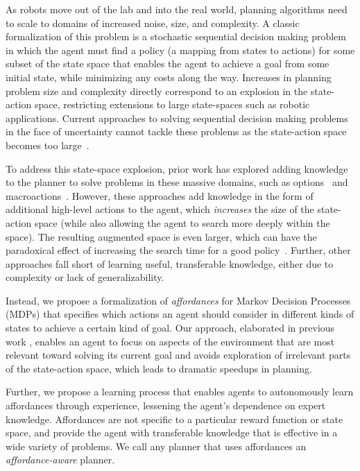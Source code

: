 \documentclass[letterpaper]{article}
\begin{document}
As robots move out of the lab and into the real world, planning
algorithms need to scale to domains of increased noise, size, and
complexity.  A classic formalization of this problem is a stochastic
sequential decision making problem in which the agent must find a
policy (a mapping from states to actions) for some subset of the state
space that enables the agent to achieve a goal from some initial
state, while minimizing any costs along the way.
Increases in planning problem size and complexity directly correspond
to an explosion in the state-action space, restricting extensions to large state-spaces
such as robotic applications. Current approaches to solving 
sequential decision making problems in the face of uncertainty cannot tackle these problems 
as the state-action space becomes too large~\cite{grounds05}.

To address this state-space explosion, prior work has explored adding
knowledge to the planner to solve problems in these
massive domains, such as options~\cite{sutton99} and
macroactions~\cite{Botea:2005kx,Newton:2005vn}. However, these
approaches add knowledge in the form of additional high-level actions
to the agent, which {\em increases} the size of the state-action space
(while also allowing the agent to search more deeply within the
space).  The resulting augmented space is even larger, which can have
the paradoxical effect of increasing the search time for a good
policy~\cite{Jong:2008zr}. Further, other approaches fall short of learning useful, transferable knowledge,
either due to complexity or lack of generalizability.

Instead, we propose a formalization of {\em affordances} \cite{gibson77} for Markov Decision Processes (MDPs) that
specifies which actions an agent should consider in different kinds of states to achieve a certain kind of goal.
Our approach, elaborated in previous work \cite{dabelgabrielbm14}, enables an agent to focus on
aspects of the environment that are most relevant toward solving its current goal 
and avoids exploration of irrelevant parts of the 
state-action space, which leads to dramatic speedups in planning.

Further, we propose a learning process that
enables agents to autonomously learn affordances through experience, lessening
the agent's dependence on expert knowledge. Affordances are not specific to a particular reward 
function or state space, and provide the agent with transferable 
knowledge that is effective in a wide variety of problems. We call any planner that
uses affordances an {\it affordance-aware} planner.
\end{document}
